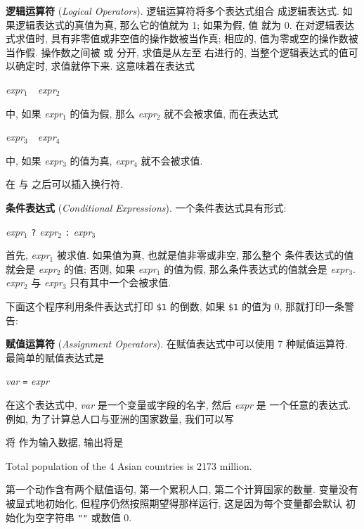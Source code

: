 \textbf{逻辑运算符} (\emph{Logical Operators}). 逻辑运算符将多个表达式组合
成逻辑表达式. 如果逻辑表达式的真值为真, 那么它的值就为 1; 如果为假, 值
就为 0. 在对逻辑表达式求值时, 具有非零值或非空值的操作数被当作真; 相应的,
值为零或空的操作数被当作假. 操作数之间被 \AND  或 \OR 分开, 求值是从左至
右进行的, 当整个逻辑表达式的值可以确定时, 求值就停下来. 这意味着在表达式
\begin{pattern}
    \textit{expr}$_1$\ \AND\ \textit{expr}$_2$
\end{pattern}
中, 如果 \textit{expr}$_1$ 的值为假, 那么 \textit{expr}$_2$ 就不会被求值,
而在表达式
\begin{pattern}
    \textit{expr}$_3$\ \OR\ \textit{expr}$_4$
\end{pattern}
中, 如果 \textit{expr}$_3$  的值为真, \textit{expr}$_4$ 就不会被求值.

在 \AND  与 \OR 之后可以插入换行符.

\textbf{条件表达式} (\emph{Conditional Expressions}). 一个条件表达式具有形式:
\begin{pattern}
    \textit{expr}$_1$ \verb'?' \textit{expr}$_2$ \verb':' \textit{expr}$_3$
\end{pattern}
首先, \textit{expr}$_1$ 被求值. 如果值为真, 也就是值非零或非空, 那么整个
条件表达式的值就会是 \textit{expr}$_2$ 的值; 否则, 如果 \textit{expr}$_1$
的值为假, 那么条件表达式的值就会是 \textit{expr}$_3$. \textit{expr}$_2$ 与
\textit{expr}$_3$ 只有其中一个会被求值.

下面这个程序利用条件表达式打印 \verb'$1' 的倒数, 如果 \verb'$1' 的值为 0,
那就打印一条警告:

\textbf{赋值运算符} (\emph{Assignment Operators}). 在赋值表达式中可以使用 7
种赋值运算符. 最简单的赋值表达式是
\begin{pattern}
    \textit{var} \verb'=' \textit{expr}
\end{pattern}
在这个表达式中, \textit{var} 是一个变量或字段的名字, 然后 \textit{expr} 是
一个任意的表达式. 例如, 为了计算总人口与亚洲的国家数量, 我们可以写
将  作为输入数据, 输出将是
\begin{awkcode}
    Total population of the 4 Asian countries is 2173 million.
\end{awkcode}
第一个动作含有两个赋值语句, 第一个累积人口, 第二个计算国家的数量. 变量没有
被显式地初始化, 但程序仍然按照期望得那样运行, 这是因为每个变量都会默认
初始化为空字符串 \verb'""' 或数值 0.

